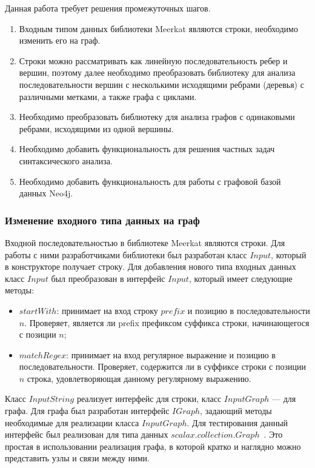 Данная работа требует решения промежуточных шагов.
\begin{enumerate}
\item Входным типом данных библиотеки Meerkat являются строки, необходимо изменить его на граф.
\item Строки можно рассматривать как линейную последовательность ребер и вершин, поэтому далее необходимо преобразовать библиотеку для анализа последовательности вершин с несколькими исходящими ребрами (деревья) с различными метками, а также графа с циклами.
\item Необходимо преобразовать библиотеку для анализа графов с одинаковыми ребрами, исходящими из одной вершины.
\item Необходимо добавить функциональность для решения частных задач синтаксического анализа.
\item Необходимо добавить функциональность для работы с графовой базой данных Neo4j.
\end{enumerate}

\subsubsection{Изменение входного типа данных на граф}


Входной последовательностью в библиотеке Meerkat являются строки. Для работы с ними разработчиками библиотеки был разработан класс $Input$, который в конструкторе получает строку. Для добавления нового типа входных данных класс $Input$ был преобразован в интерфейс $Input$, который имеет следующие методы:
\begin{itemize}
\item $startWith$: принимает на вход строку $prefix$ и позицию в последовательности $n$. Проверяет, является ли prefix префиксом суффикса строки, начинающегося с позиции $n$;
\item $matchRegex$: принимает на вход регулярное выражение и позицию в последовательности. Проверяет, содержится ли в суффиксе строки с позиции $n$ строка, удовлетворяющая данному регулярному выражению.
\end{itemize}

Класс $InputString$ реализует интерфейс для строки, класс $InputGraph$ --- для графа. Для графа был разработан интерфейс $IGraph$, задающий методы необходимые для реализации класса $InputGraph$. Для тестирования данный интерфейс был реализован для типа данных $scalax.collection.Graph$~\cite{Graph}. Это простая в использовании реализация графа, в которой кратко и наглядно можно представить узлы и связи между ними.

